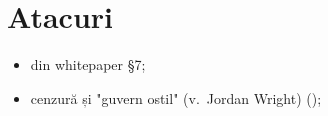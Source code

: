 
\chapter{Atacuri}

\begin{itemize}
  \item din whitepaper \S7;
  \item cenzură și "guvern ostil" (v.\ Jordan Wright) (\cite{jw2});
\end{itemize}


